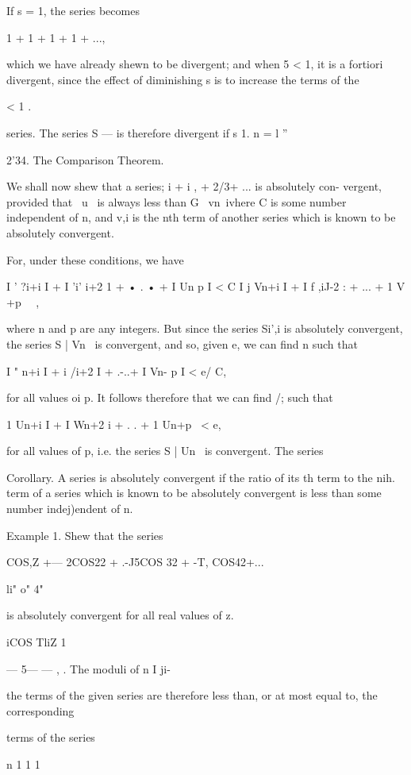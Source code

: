 If s = 1, the series becomes

1 + 1 + 1 + 1 + ...,

which we have already shewn to be divergent; and when 5 < 1, it is a
fortiori divergent, since the effect of diminishing s is to increase
the terms of the

< 1 .

series. The series S — is therefore divergent if s 1. n = l ''

2'34. The Comparison Theorem.

We shall now shew that a series; i + i , + 2/3+ ... is absolutely
con- vergent, provided that \ u \ is always less than G \ vn\, ivhere
C is some number independent of n, and v,i is the nth term of another
series which is known to be absolutely convergent.

For, under these conditions, we have

I ' ?i+i I + I 'i' i+2 1 + • . • + I Un p I < C I j Vn+i I + I f ,iJ-2
: + ... + 1 V +p \ \ ,

where n and p are any integers. But since the series Si',i is
absolutely convergent, the series S | Vn \ is convergent, and so,
given e, we can find n such that

I " n+i I + i /i+2 I + .-..+ I Vn- p I < e/ C,

for all values oi p. It follows therefore that we can find /; such
that

1 Un+i I + I Wn+2 i + . . + 1 Un+p \ < e,

for all values of p, i.e. the series S | Un \ is convergent. The
series %

Corollary. A series is absolutely convergent if the ratio of its th
term to the nih. term of a series which is known to be absolutely
convergent is less than some number indej)endent of n.

Example 1. Shew that the series

COS,Z +— 2COS22 + .-J5COS 32 + -T, COS42+...

li" o" 4"

is absolutely convergent for all real values of z.

iCOS TliZ 1

— 5— — , . The moduli of n I ji-

the terms of the given series are therefore less than, or at most
equal to, the corresponding

terms of the series

n 1 1 1

